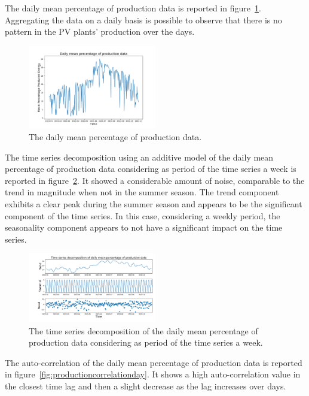 The daily mean percentage of production data is reported in figure~\ref{fig:productiondataplotday}.
Aggregating the data on a daily basis is possible to observe that there is no pattern in the PV plants’ production over the days.

\begin{figure}[H]
\centering
\includegraphics[width=0.5\textwidth]{images/production/data_day_aggregated_plot}
\caption{The daily mean percentage of production data.}
\label{fig:productiondataplotday}
\end{figure}

The time series decomposition using an additive model of the daily mean percentage of production data considering as period of the time series a week is reported in figure~\ref{fig:productiondecompositionday}.
It showed a considerable amount of noise, comparable to the trend in magnitude when not in the summer season.
The trend component exhibits a clear peak during the summer season and appears to be the significant component of the time series.
In this case, considering a weekly period, the seasonality component appears to not have a significant impact on the time series.

\begin{figure}[H]
\centering
\includegraphics[width=0.5\textwidth]{images/production/daily_aggregated_decomposition}
\caption{The time series decomposition of the daily mean percentage of production data considering as period of the time series a week.}
\label{fig:productiondecompositionday}
\end{figure}

The auto-correlation of the daily mean percentage of production data is reported in figure~\ref{fig:productioncorrelationday}.
It shows a high auto-correlation value in the closest time lag and then a slight decrease as the lag increases over days.

